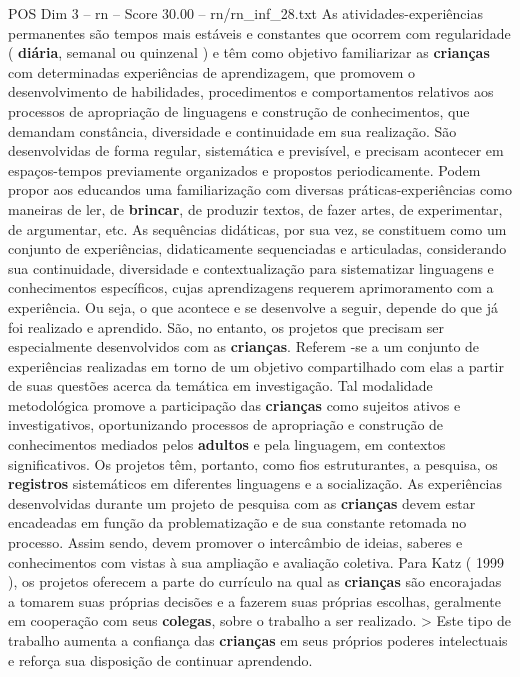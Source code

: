 \begin{textsample}{POS Dim 3 – rn – Score 30.00 – rn/rn\_inf\_28.txt}
As atividades-experiências permanentes são tempos mais estáveis e constantes que ocorrem com regularidade ( \textbf{diária}, semanal ou quinzenal ) e têm como objetivo familiarizar as \textbf{crianças} com determinadas experiências de aprendizagem, que promovem o desenvolvimento de habilidades, procedimentos e comportamentos relativos aos processos de apropriação de linguagens e construção de conhecimentos, que demandam constância, diversidade e continuidade em sua realização.
São desenvolvidas de forma regular, sistemática e previsível, e precisam acontecer em espaços-tempos previamente organizados e propostos periodicamente.
Podem propor aos educandos uma familiarização com diversas práticas-experiências como maneiras de ler, de \textbf{brincar}, de produzir textos, de fazer artes, de experimentar, de argumentar, etc.
As sequências didáticas, por sua vez, se constituem como um conjunto de experiências, didaticamente sequenciadas e articuladas, considerando sua continuidade, diversidade e contextualização para sistematizar linguagens e conhecimentos específicos, cujas aprendizagens requerem aprimoramento com a experiência.
Ou seja, o que acontece e se desenvolve a seguir, depende do que já foi realizado e aprendido.
São, no entanto, os projetos que precisam ser especialmente desenvolvidos com as \textbf{crianças}.
Referem -se a um conjunto de experiências realizadas em torno de um objetivo compartilhado com elas a partir de suas questões acerca da temática em investigação.
Tal modalidade metodológica promove a participação das \textbf{crianças} como sujeitos ativos e investigativos, oportunizando processos de apropriação e construção de conhecimentos mediados pelos \textbf{adultos} e pela linguagem, em contextos significativos.
Os projetos têm, portanto, como fios estruturantes, a pesquisa, os \textbf{registros} sistemáticos em diferentes linguagens e a socialização.
As experiências desenvolvidas durante um projeto de pesquisa com as \textbf{crianças} devem estar encadeadas em função da problematização e de sua constante retomada no processo.
Assim sendo, devem promover o intercâmbio de ideias, saberes e conhecimentos com vistas à sua ampliação e avaliação coletiva.
Para Katz ( 1999 ), os projetos oferecem a parte do currículo na qual as \textbf{crianças} são encorajadas a tomarem suas próprias decisões e a fazerem suas próprias escolhas, geralmente em cooperação com seus \textbf{colegas}, sobre o trabalho a ser realizado. > Este tipo de trabalho aumenta a confiança das \textbf{crianças} em seus próprios poderes intelectuais e reforça sua disposição de continuar aprendendo.

\end{textsample}
